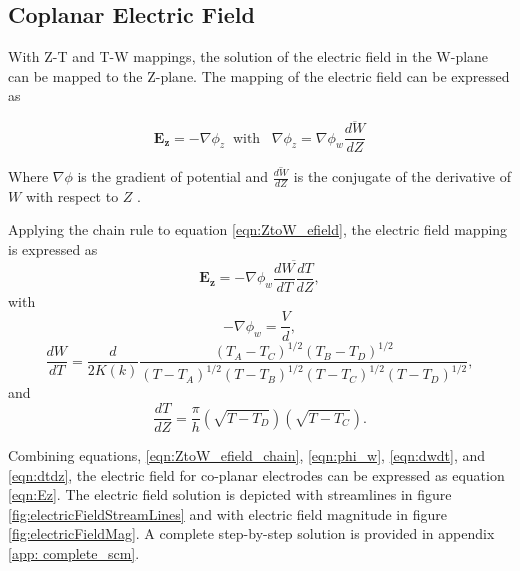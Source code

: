 \subsection{Coplanar Electric Field}

 \par With Z-T and T-W mappings, the solution of the electric field in the W-plane can be mapped to the Z-plane. The mapping of the electric field can be expressed as 
 
 \begin{equation}
     \boldsymbol{E_z} = -\nabla \phi_z \;\;\text{with} \;\;\;\nabla \phi_z = \nabla \phi_w \overline{\frac{dW}{dZ}}
     \label{eqn:ZtoW_efield}
 \end{equation}
 
 \noindent Where $\nabla \phi$ is the gradient of potential and $\overline{\frac{dW}{dZ}}$ is the conjugate of the derivative of $W$ with respect to $Z$ \cite{schinzinger_conformal_2012}.
 
 \par Applying the chain rule to equation \ref{eqn:ZtoW_efield}, the electric field mapping is expressed as
 \begin{equation}
    \boldsymbol{E_z} =- \nabla \phi_w \overline{\frac{dW}{dT}\frac{dT}{dZ}},
    \label{eqn:ZtoW_efield_chain}
 \end{equation}
\noindent with 
 \begin{equation}
     -\nabla \phi_w = \frac{V}{d},
     \label{eqn:phi_w}
 \end{equation}
 \begin{equation}
     \frac{dW}{dT} = \frac{d}{2K(k)}\frac{(T_A - T_C)^{1/2}(T_B-T_D)^{1/2}}{(T-T_A)^{1/2}(T-T_B)^{1/2}(T-T_C)^{1/2}(T-T_D)^{1/2}},
     \label{eqn:dwdt}
 \end{equation}
 \noindent and
 \begin{equation}
     \frac{dT}{dZ} = \frac{\pi}{h}(\sqrt{T-T_D})(\sqrt{T-T_C}).
     \label{eqn:dtdz}
 \end{equation}
 
 \par Combining equations, \ref{eqn:ZtoW_efield_chain}, \ref{eqn:phi_w}, \ref{eqn:dwdt}, and \ref{eqn:dtdz}, the electric field for co-planar electrodes can be expressed as equation \ref{eqn:Ez}. The electric field solution is depicted with streamlines in figure \ref{fig:electricFieldStreamLines} and with electric field magnitude in figure \ref{fig:electricFieldMag}. A complete step-by-step solution is provided in appendix \ref{app: complete_scm}.
 
